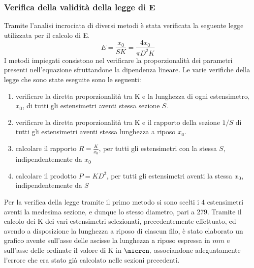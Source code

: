 \documentclass[a4paper,11pt,oneside]{article}
\begin{document}
\subsubsection*{Verifica della validità della legge di E}
Tramite l'analisi incrociata di diversi metodi è stata verificata la seguente legge utilizzata per il calcolo di E.
\begin{equation*}
    E=\frac{x_0}{S K}=\frac{4 x_0}{\pi D^{2}K}
    \label{equation:legge_e}
\end{equation*}
I metodi impiegati consistono nel verificare la proporzionalità dei parametri presenti nell'equazione sfruttandone la dipendenza lineare. Le varie verifiche della legge che sono state eseguite sono le seguenti:
\begin{enumerate}
    \item verificare la diretta proporzionalità tra K e la lunghezza di ogni estensimetro, $x_0$, di tutti gli estensimetri aventi stessa sezione $S$.
    \item verificare la diretta proporzionalità tra K e il rapporto della sezione $1/S$ di tutti gli estensimetri aventi stessa lunghezza a riposo $x_{0}$.
    \item calcolare il rapporto $R=\frac{K}{x_{0}}$, per tutti gli estensimetri con la stessa $S$, indipendentemente da $x_{0}$
    \item calcolare il prodotto $P= KD^2 $, per tutti gli estensimetri aventi la stessa $x_{0}$, indipendentemente da $S$
\end{enumerate}
Per la verifica della legge tramite il primo metodo si sono scelti i 4  estensimetri aventi la medesima sezione, e dunque lo stesso diametro, pari a 279. Tramite il calcolo dei K dei vari estensimetri selezionati, precedentemente effettuato, ed avendo a disposizione la lunghezza a riposo di ciascun filo, è stato elaborato un grafico avente sull'asse delle ascisse la lunghezza a riposo espressa in $mm$ e sull'asse delle ordinate il valore di K in $\micron$, associandone adeguatamente l'errore che era stato già calcolato nelle sezioni precedenti.
\end{document}
